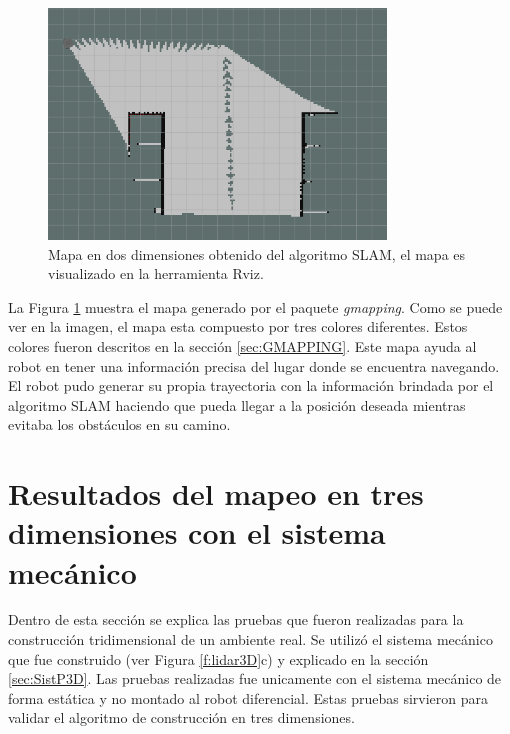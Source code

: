 \begin{figure}
  \centering \footnotesize
  \includegraphics[width=0.80\textwidth]{images/map_slam.png}
  \captionsetup{font=footnotesize}
  \caption{Mapa en dos dimensiones obtenido del algoritmo SLAM, el mapa es 
  visualizado en la herramienta Rviz.}
  \label{fig:SLAM_2D}
\end{figure}

La Figura \ref{fig:SLAM_2D} muestra el mapa generado por el paquete \textit{gmapping}. Como 
se puede ver en la imagen, el mapa esta compuesto por tres colores diferentes. Estos
colores fueron descritos en la sección \ref{sec:GMAPPING}. Este mapa ayuda al robot
en tener una información precisa del lugar donde se encuentra navegando. El robot pudo
generar su propia trayectoria con la información brindada por el algoritmo SLAM haciendo
que pueda llegar a la posición deseada mientras evitaba los obstáculos en su camino.


\section{Resultados del mapeo en tres dimensiones con el sistema mecánico}

Dentro de esta sección se explica las pruebas que fueron realizadas para la construcción
tridimensional de un ambiente real. Se utilizó el sistema mecánico que fue construido 
(ver Figura \ref{f:lidar3D}c) y explicado en la sección \ref{sec:SistP3D}. Las pruebas 
realizadas fue unicamente con el sistema mecánico de forma estática y no montado al robot 
diferencial. Estas pruebas sirvieron para validar el algoritmo de construcción 
en tres dimensiones.

